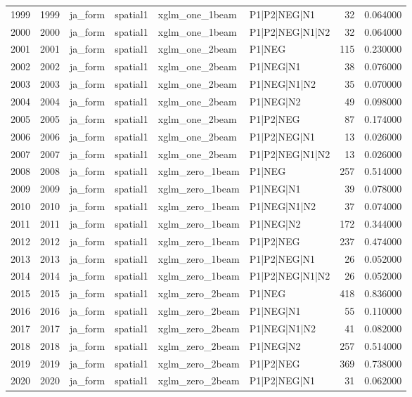 \begin{tabular}{lrllllrr}
1999 & 1999 & ja_form & spatial1 & xglm_one_1beam & P1|P2|NEG|N1 & 32 & 0.064000 \\
2000 & 2000 & ja_form & spatial1 & xglm_one_1beam & P1|P2|NEG|N1|N2 & 32 & 0.064000 \\
2001 & 2001 & ja_form & spatial1 & xglm_one_2beam & P1|NEG & 115 & 0.230000 \\
2002 & 2002 & ja_form & spatial1 & xglm_one_2beam & P1|NEG|N1 & 38 & 0.076000 \\
2003 & 2003 & ja_form & spatial1 & xglm_one_2beam & P1|NEG|N1|N2 & 35 & 0.070000 \\
2004 & 2004 & ja_form & spatial1 & xglm_one_2beam & P1|NEG|N2 & 49 & 0.098000 \\
2005 & 2005 & ja_form & spatial1 & xglm_one_2beam & P1|P2|NEG & 87 & 0.174000 \\
2006 & 2006 & ja_form & spatial1 & xglm_one_2beam & P1|P2|NEG|N1 & 13 & 0.026000 \\
2007 & 2007 & ja_form & spatial1 & xglm_one_2beam & P1|P2|NEG|N1|N2 & 13 & 0.026000 \\
2008 & 2008 & ja_form & spatial1 & xglm_zero_1beam & P1|NEG & 257 & 0.514000 \\
2009 & 2009 & ja_form & spatial1 & xglm_zero_1beam & P1|NEG|N1 & 39 & 0.078000 \\
2010 & 2010 & ja_form & spatial1 & xglm_zero_1beam & P1|NEG|N1|N2 & 37 & 0.074000 \\
2011 & 2011 & ja_form & spatial1 & xglm_zero_1beam & P1|NEG|N2 & 172 & 0.344000 \\
2012 & 2012 & ja_form & spatial1 & xglm_zero_1beam & P1|P2|NEG & 237 & 0.474000 \\
2013 & 2013 & ja_form & spatial1 & xglm_zero_1beam & P1|P2|NEG|N1 & 26 & 0.052000 \\
2014 & 2014 & ja_form & spatial1 & xglm_zero_1beam & P1|P2|NEG|N1|N2 & 26 & 0.052000 \\
2015 & 2015 & ja_form & spatial1 & xglm_zero_2beam & P1|NEG & 418 & 0.836000 \\
2016 & 2016 & ja_form & spatial1 & xglm_zero_2beam & P1|NEG|N1 & 55 & 0.110000 \\
2017 & 2017 & ja_form & spatial1 & xglm_zero_2beam & P1|NEG|N1|N2 & 41 & 0.082000 \\
2018 & 2018 & ja_form & spatial1 & xglm_zero_2beam & P1|NEG|N2 & 257 & 0.514000 \\
2019 & 2019 & ja_form & spatial1 & xglm_zero_2beam & P1|P2|NEG & 369 & 0.738000 \\
2020 & 2020 & ja_form & spatial1 & xglm_zero_2beam & P1|P2|NEG|N1 & 31 & 0.062000 \\

\end{tabular}
